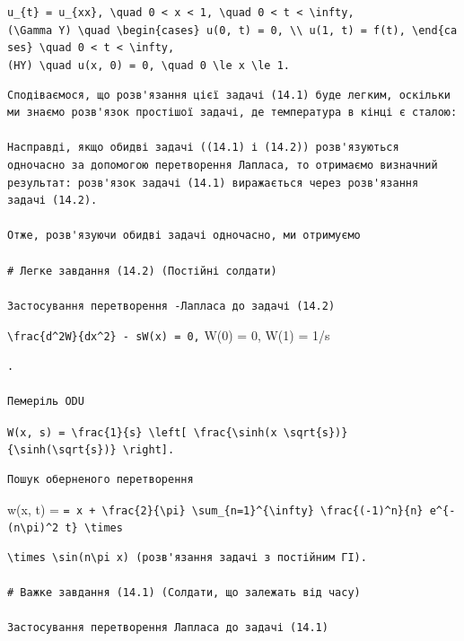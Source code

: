 \documentclass[
  ukrainian,
]{article}
\begin{document}
\texttt{u\_\{t\}\ =\ u\_\{xx\},\ \textbackslash{}quad\ 0\ \textless{}\ x\ \textless{}\ 1,\ \textbackslash{}quad\ 0\ \textless{}\ t\ \textless{}\ \textbackslash{}infty,}
\texttt{(\textbackslash{}Gamma\ Y)\ \textbackslash{}quad\ \textbackslash{}begin\{cases\}\ u(0,\ t)\ =\ 0,\ \textbackslash{}\textbackslash{}\ u(1,\ t)\ =\ f(t),\ \textbackslash{}end\{cases\}\ \textbackslash{}quad\ 0\ \textless{}\ t\ \textless{}\ \textbackslash{}infty,}
\texttt{(HY)\ \textbackslash{}quad\ u(x,\ 0)\ =\ 0,\ \textbackslash{}quad\ 0\ \textbackslash{}le\ x\ \textbackslash{}le\ 1.}

\begin{verbatim}
Сподіваємося, що розв'язання цієї задачі (14.1) буде легким, оскільки ми знаємо розв'язок простішої задачі, де температура в кінці є сталою:

Насправді, якщо обидві задачі ((14.1) і (14.2)) розв'язуються одночасно за допомогою перетворення Лапласа, то отримаємо визначний результат: розв'язок задачі (14.1) виражається через розв'язання задачі (14.2).

Отже, розв'язуючи обидві задачі одночасно, ми отримуємо

# Легке завдання (14.2) (Постійні солдати)

Застосування перетворення -Лапласа до задачі (14.2)
\end{verbatim}

\texttt{\textbackslash{}frac\{d\^{}2W\}\{dx\^{}2\}\ -\ sW(x)\ =\ 0,}
W(0) = 0, W(1) = 1/s

\begin{verbatim}
.

Пемеріль ODU
\end{verbatim}

\texttt{W(x,\ s)\ =\ \textbackslash{}frac\{1\}\{s\}\ \textbackslash{}left{[}\ \textbackslash{}frac\{\textbackslash{}sinh(x\ \textbackslash{}sqrt\{s\})\}\{\textbackslash{}sinh(\textbackslash{}sqrt\{s\})\}\ \textbackslash{}right{]}.}

\begin{verbatim}
Пошук оберненого перетворення
\end{verbatim}

w(x, t) =
\texttt{=\ x\ +\ \textbackslash{}frac\{2\}\{\textbackslash{}pi\}\ \textbackslash{}sum\_\{n=1\}\^{}\{\textbackslash{}infty\}\ \textbackslash{}frac\{(-1)\^{}n\}\{n\}\ e\^{}\{-(n\textbackslash{}pi)\^{}2\ t\}\ \textbackslash{}times}

\begin{verbatim}
\times \sin(n\pi x) (розв'язання задачі з постійним ГІ).

# Важке завдання (14.1) (Солдати, що залежать від часу)

Застосування перетворення Лапласа до задачі (14.1)
\end{verbatim}
\end{document}
